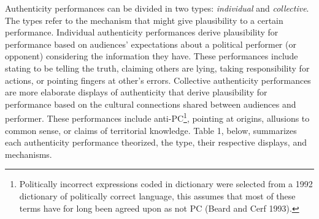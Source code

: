 \documentclass[
  12pt,
]{article}
\begin{document}
Authenticity performances can be divided in two types: \emph{individual}
and \emph{collective}. The types refer to the mechanism that might give
plausibility to a certain performance. Individual authenticity
performances derive plausibility for performance based on audiences'
expectations about a political performer (or opponent) considering the
information they have. These performances include stating to be telling
the truth, claiming others are lying, taking responsibility for actions,
or pointing fingers at other's errors. Collective authenticity
performances are more elaborate displays of authenticity that derive
plausibility for performance based on the cultural connections shared
between audiences and performer. These performances include
anti-PC\footnote{ Politically incorrect expressions coded in dictionary
  were selected from a 1992 dictionary of politically correct language,
  this assumes that most of these terms have for long been agreed upon
  as not PC (Beard and Cerf 1993).}, pointing at origins, allusions to
common sense, or claims of territorial knowledge. Table 1, below,
summarizes each authenticity performance theorized, the type, their
respective displays, and mechanisms.
\end{document}
